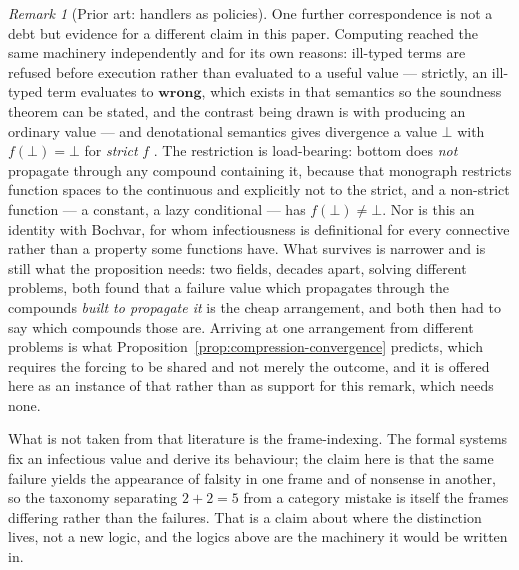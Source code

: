 \documentclass[11pt,a4paper]{article}
\theoremstyle{remark}\newtheorem{remark}[definition]{Remark}
\begin{document}
\begin{remark}[Prior art: handlers as policies]
One further correspondence is not a debt but evidence for a different claim in this paper. Computing
reached the same machinery independently and for its own reasons: ill-typed terms are refused before
execution rather than evaluated to a useful value \citep{milner1978} --- strictly, an ill-typed term
evaluates to $\mathbf{wrong}$, which exists in that semantics so the soundness theorem can be stated,
and the contrast being drawn is with producing an ordinary value --- and denotational semantics gives
divergence a value $\bot$ with $f(\bot)=\bot$ for \emph{strict} $f$ \citep{scott1971}. The restriction is load-bearing: bottom does \emph{not} propagate through any compound containing it,
because that monograph restricts function spaces to the
continuous and explicitly not to the strict, and a non-strict function --- a constant, a lazy
conditional --- has $f(\bot)\neq\bot$. Nor is this an identity with Bochvar, for whom infectiousness is
definitional for every connective rather than a property some functions have. What survives is
narrower and is still what the proposition needs: two fields, decades apart, solving different problems,
both found that a failure value which propagates through the compounds \emph{built to propagate it} is
the cheap arrangement, and both then had to say which compounds those are. Arriving at one arrangement
from different problems is what Proposition~\ref{prop:compression-convergence} predicts,
which requires the forcing to be shared and not merely the outcome, and it is offered here as an instance of that
rather than as support for this remark, which needs none.

What is not taken from that literature is the frame-indexing. The formal systems fix an infectious
value and derive its behaviour; the claim here is that the same failure yields the appearance of
falsity in one frame and of nonsense in another, so the taxonomy separating $2+2=5$ from a category
mistake is itself the frames differing rather than the failures. That is a claim about where the
distinction lives, not a new logic, and the logics above are the machinery it would be written in.
\end{remark}
\end{document}

